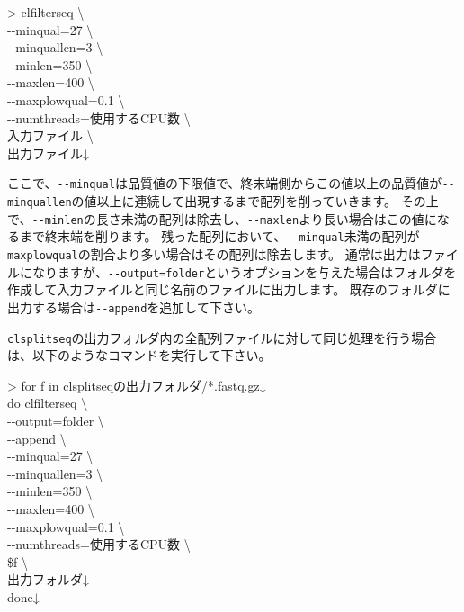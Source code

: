 \documentclass[titlepage,10pt,a4paper]{jsbook}
\newenvironment{cmd}{\begin{oframed}\raggedright\ttfamily\footnotesize\setlength{\baselineskip}{1.4em}}{\end{oframed}\vspace{-1em}}
\begin{document}
\begin{cmd}
{\textgreater} clfilterseq {\textbackslash}\\
{-}{-}minqual=27 {\textbackslash}\\
{-}{-}minquallen=3 {\textbackslash}\\
{-}{-}minlen=350 {\textbackslash}\\
{-}{-}maxlen=400 {\textbackslash}\\
{-}{-}maxplowqual=0.1 {\textbackslash}\\
{-}{-}numthreads=使用するCPU数 {\textbackslash}\\
入力ファイル {\textbackslash}\\
出力ファイル↓
\end{cmd}

ここで、\texttt{{-}{-}minqual}は品質値の下限値で、終末端側からこの値以上の品質値が\texttt{{-}{-}minquallen}の値以上に連続して出現するまで配列を削っていきます。
その上で、\texttt{{-}{-}minlen}の長さ未満の配列は除去し、\texttt{{-}{-}maxlen}より長い場合はこの値になるまで終末端を削ります。
残った配列において、\texttt{{-}{-}minqual}未満の配列が\texttt{{-}{-}maxplowqual}の割合より多い場合はその配列は除去します。
通常は出力はファイルになりますが、\texttt{{-}{-}output=folder}というオプションを与えた場合はフォルダを作成して入力ファイルと同じ名前のファイルに出力します。
既存のフォルダに出力する場合は\texttt{{-}{-}append}を追加して下さい。

\texttt{clsplitseq}の出力フォルダ内の全配列ファイルに対して同じ処理を行う場合は、以下のようなコマンドを実行して下さい。

\begin{cmd}
{\textgreater} for f in clsplitseqの出力フォルダ/*.fastq.gz↓\\
do clfilterseq {\textbackslash}\\
{-}{-}output=folder {\textbackslash}\\
{-}{-}append {\textbackslash}\\
{-}{-}minqual=27 {\textbackslash}\\
{-}{-}minquallen=3 {\textbackslash}\\
{-}{-}minlen=350 {\textbackslash}\\
{-}{-}maxlen=400 {\textbackslash}\\
{-}{-}maxplowqual=0.1 {\textbackslash}\\
{-}{-}numthreads=使用するCPU数 {\textbackslash}\\
\$f {\textbackslash}\\
出力フォルダ↓\\
done↓
\end{cmd}
\end{document}
